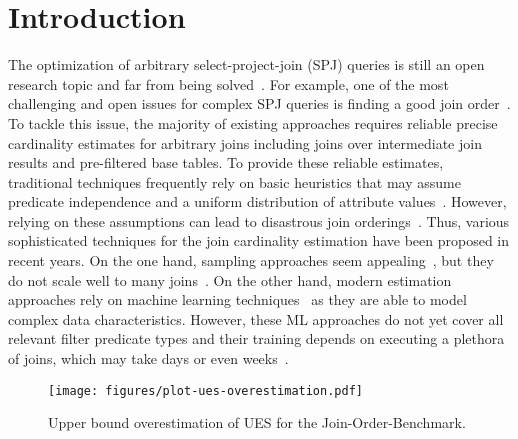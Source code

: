 \section{Introduction}
\label{sec:Introduction}

The optimization of arbitrary select-project-join (SPJ) queries is still an open research topic and far from being solved~\cite{DBLP:journals/pvldb/LeisGMBK015}.
For example, one of the most challenging and open issues for complex SPJ queries is finding a good join order~\cite{DBLP:conf/sigmod/CaiBS19,hertzschuch-21-ues,DBLP:journals/pvldb/LeisGMBK015}.
To tackle this issue, the majority of existing approaches requires reliable precise cardinality estimates for arbitrary joins including joins over intermediate join results and pre-filtered base tables.
To provide these reliable estimates, traditional techniques frequently rely on basic heuristics that may assume predicate independence and a uniform distribution of attribute values~\cite{DBLP:journals/pvldb/LeisGMBK015}. 
However, relying on these assumptions can lead to disastrous join orderings~\cite{DBLP:journals/pvldb/LeisGMBK015}. 
Thus, various sophisticated techniques for the join cardinality estimation have been proposed in recent years.
On the one hand, sampling approaches seem appealing~\cite{DBLP:conf/cidr/LeisRGK017,DBLP:conf/cidr/MoerkotteH20,DBLP:conf/sigmod/ZhaoC0HY18}, but they do not scale well to many joins~\cite{DBLP:conf/sigmod/ChenY17,DBLP:conf/sigmod/ZhaoC0HY18}. 
On the other hand, modern estimation approaches rely on machine learning techniques~\cite{DBLP:conf/cidr/KipfKRLBK19,DBLP:conf/sigmod/WoltmannHTHL19} as they are able to model complex data characteristics. 
However, these ML approaches do not yet cover all relevant filter predicate types and their training depends on executing a plethora of joins, which may take days or even weeks~\cite{DBLP:conf/sigmod/WoltmannHHL20,DBLP:conf/btw/WoltmannHHL21}.

\begin{figure}[t]
    \centering
    \texttt{[image: figures/plot-ues-overestimation.pdf]}
    \caption{Upper bound overestimation of UES for the Join-Order-Benchmark.}
    \label{fig:UESOverestimationJOB}
\end{figure}

